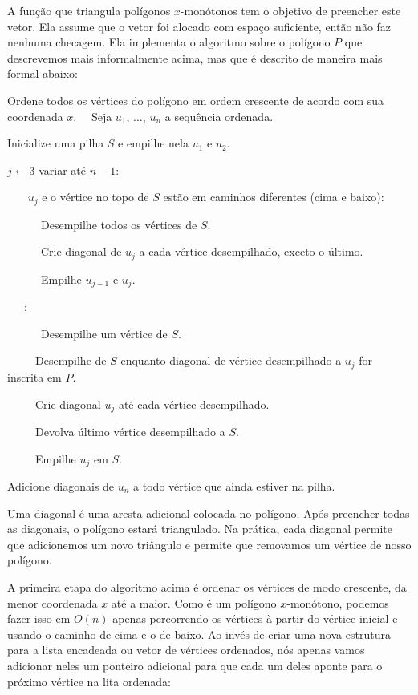 {{{{{{A função que triangula polígonos $x$-monótonos tem o objetivo de
preencher este vetor. Ela assume que o vetor foi alocado com espaço
suficiente, então não faz nenhuma checagem. Ela implementa o algoritmo
sobre o polígono $P$ que descrevemos mais informalmente acima, mas que
é descrito de maneira mais formal abaixo:

\noindent{} Ordene todos os vértices do polígono em ordem crescente
de acordo com sua coordenada $x$.\quebra
\relax\ \ Seja $u_1$, $\ldots$, $u_n$ a sequência ordenada.

\noindent{} Inicialize uma pilha $S$ e empilhe nela $u_1$ e $u_2$.

\noindent{}  $j\leftarrow 3$ variar até $n-1$:

\noindent{}\ \ \  $u_j$ e o vértice no topo de $S$ estão em caminhos
diferentes (cima e baixo):

\noindent{}\ \ \ \ \ \ Desempilhe todos os vértices de $S$.

\noindent{}\ \ \ \ \ \ Crie diagonal de $u_j$
a cada vértice desempilhado, exceto o último.

\noindent{}\ \ \ \ \ \ Empilhe $u_{j-1}$ e $u_j$.

\noindent{}\ \ \ :

\noindent{}\ \ \ \ \ \ Desempilhe um vértice de $S$.

\noindent{}\ \ \ \ \ Desempilhe de $S$ enquanto diagonal de vértice desempilhado a $u_j$ for inscrita em $P$.

\noindent{}\ \ \ \ \ Crie diagonal $u_j$ até cada vértice desempilhado.

\noindent{}\ \ \ \ \ Devolva último vértice desempilhado a $S$.

\noindent{}\ \ \ \ \ Empilhe $u_j$ em $S$.

\noindent{} Adicione diagonais de $u_n$ a todo vértice que ainda estiver na
pilha.

Uma diagonal é uma aresta adicional colocada no polígono. Após
preencher todas as diagonais, o polígono estará triangulado. Na
prática, cada diagonal permite que adicionemos um novo triângulo e
permite que removamos um vértice de nosso polígono.

A primeira etapa do algoritmo acima é ordenar os vértices de modo
crescente, da menor coordenada $x$ até a maior. Como é um polígono
$x$-monótono, podemos fazer isso em $O(n)$ apenas percorrendo os
vértices à partir do vértice inicial e usando o caminho de cima e o de
baixo. Ao invés de criar uma nova estrutura para a lista encadeada ou
vetor de vértices ordenados, nós apenas vamos adicionar neles um
ponteiro adicional para que cada um deles aponte para o próximo
vértice na lita ordenada:

}}}}}}
